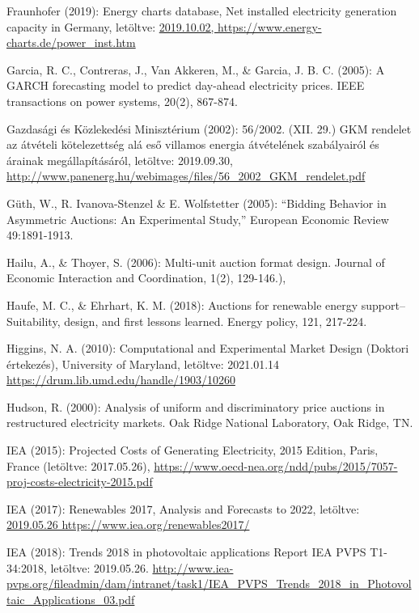 \documentclass[twoside, magyar, showtrims]{corvinusphd}
\theoremstyle{plain}
\theoremstyle{remark}
\theoremstyle{definition}
\begin{document}
\begin{thebibliography}{99}
Fraunhofer (2019): Energy charts database, Net installed electricity generation capacity in Germany, letöltve:
\url{2019.10.02, https://www.energy-charts.de/power\_inst.htm}

Garcia, R. C., Contreras, J., Van Akkeren, M., \& Garcia, J. B. C. (2005): A GARCH forecasting model to predict day-ahead electricity prices. IEEE transactions on power systems, 20(2), 867-874.

Gazdasági és Közlekedési Minisztérium (2002): 56/2002. (XII. 29.) GKM rendelet 
az átvételi kötelezettség alá eső villamos energia átvételének szabályairól és árainak megállapításáról, letöltve: 2019.09.30, 
\url{http://www.panenerg.hu/webimages/files/56\_2002\_GKM\_rendelet.pdf}

Güth, W., R. Ivanova-Stenzel \& E. Wolfstetter (2005): “Bidding Behavior in Asymmetric Auctions: An Experimental Study,” European Economic Review 49:1891-1913.

Hailu, A., \& Thoyer, S. (2006): Multi-unit auction format design. Journal of Economic Interaction and Coordination, 1(2), 129-146.),

Haufe, M. C., \& Ehrhart, K. M. (2018): Auctions for renewable energy support–Suitability, design, and first lessons learned. Energy policy, 121, 217-224.

Higgins, N. A. (2010): Computational and Experimental Market Design (Doktori értekezés), University of Maryland, letöltve: 2021.01.14
\url{https://drum.lib.umd.edu/handle/1903/10260}

Hudson, R. (2000): Analysis of uniform and discriminatory price auctions in restructured electricity markets. Oak Ridge National Laboratory, Oak Ridge, TN.

IEA (2015): Projected Costs of Generating Electricity, 2015 Edition, Paris, France (letöltve: 2017.05.26),
\url{https://www.oecd-nea.org/ndd/pubs/2015/7057-proj-costs-electricity-2015.pdf}

IEA (2017): Renewables 2017, Analysis and Forecasts to 2022, letöltve:
\url{2019.05.26 https://www.iea.org/renewables2017/}

IEA (2018): Trends 2018 in photovoltaic applications Report IEA PVPS T1-34:2018, letöltve: 2019.05.26.
\url{http://www.iea-pvps.org/fileadmin/dam/intranet/task1/IEA\_PVPS\_Trends\_2018\_in\_Photovoltaic\_Applications\_03.pdf}


\end{thebibliography}
\end{document}
